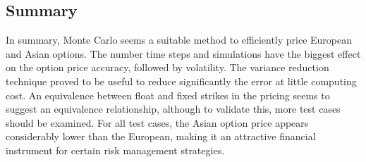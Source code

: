 \documentclass{article}
\begin{document}
    \subsection{Summary}\label{summary}

In summary, Monte Carlo seems a suitable method to efficiently price European
and Asian options. The number time steps and simulations have the biggest effect on
the option price accuracy, followed by volatility. The variance
reduction technique proved to be useful to reduce significantly the
error at little computing cost. An equivalence between float and fixed
strikes in the pricing seems to suggest an equivalence relationship, although to
validate this, more test cases should be examined. For all test cases,
the Asian option price appears considerably lower than the European,
making it an attractive financial instrument for certain risk management
strategies.


    
    
    
    
\end{document}
